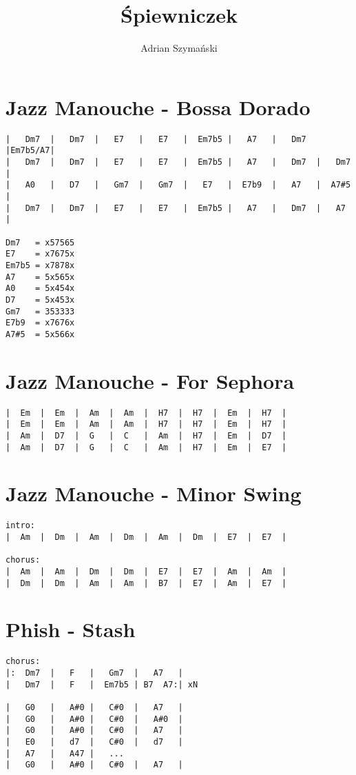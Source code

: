 \documentclass{article}
\title{Śpiewniczek}
\author{Adrian Szymański}
\begin{document}
\maketitle
\newpage
\tableofcontents
\newpage
\section{Jazz Manouche - Bossa Dorado}
\begin{verbatim}
|   Dm7  |   Dm7  |   E7   |   E7   |  Em7b5 |   A7   |   Dm7  |Em7b5/A7|
|   Dm7  |   Dm7  |   E7   |   E7   |  Em7b5 |   A7   |   Dm7  |   Dm7  |
|   A0   |   D7   |   Gm7  |   Gm7  |   E7   |  E7b9  |   A7   |  A7#5  |
|   Dm7  |   Dm7  |   E7   |   E7   |  Em7b5 |   A7   |   Dm7  |   A7   |

Dm7   = x57565 
E7    = x7675x
Em7b5 = x7878x
A7    = 5x565x
A0    = 5x454x
D7    = 5x453x
Gm7   = 353333
E7b9  = x7676x
A7#5  = 5x566x
\end{verbatim}\section{Jazz Manouche - For Sephora}
\begin{verbatim}
|  Em  |  Em  |  Am  |  Am  |  H7  |  H7  |  Em  |  H7  |
|  Em  |  Em  |  Am  |  Am  |  H7  |  H7  |  Em  |  H7  |
|  Am  |  D7  |  G   |  C   |  Am  |  H7  |  Em  |  D7  |
|  Am  |  D7  |  G   |  C   |  Am  |  H7  |  Em  |  E7  |
\end{verbatim}\section{Jazz Manouche - Minor Swing}
\begin{verbatim}
intro:
|  Am  |  Dm  |  Am  |  Dm  |  Am  |  Dm  |  E7  |  E7  |

chorus:
|  Am  |  Am  |  Dm  |  Dm  |  E7  |  E7  |  Am  |  Am  |
|  Dm  |  Dm  |  Am  |  Am  |  B7  |  E7  |  Am  |  E7  |
\end{verbatim}\section{Phish - Stash}

\begin{verbatim}
chorus:
|:  Dm7  |   F   |   Gm7  |   A7   |
|   Dm7  |   F   |  Em7b5 | B7  A7:| xN

|   G0   |   A#0 |   C#0  |   A7   |
|   G0   |   A#0 |   C#0  |   A#0  |
|   G0   |   A#0 |   C#0  |   A7   |
|   E0   |   d7  |   C#0  |   d7   |
|   A7   |   A47 |   ...
|   G0   |   A#0 |   C#0  |   A7   |
\end{verbatim}
\end{document}
